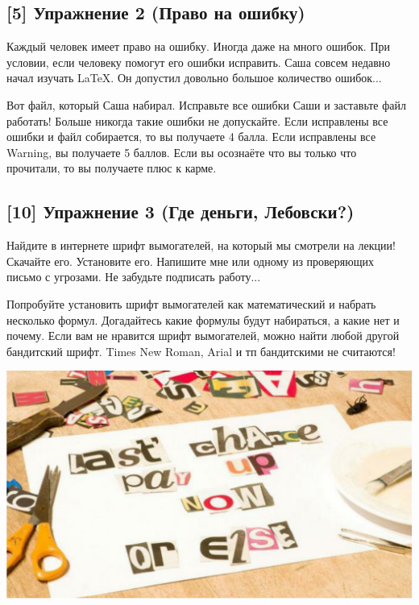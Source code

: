 \documentclass[12pt, a4paper, oneside]{article}
\begin{document}
\subsection*{[5]  Упражнение 2 (Право на ошибку)}


Каждый человек имеет право на ошибку. Иногда даже на много ошибок. При условии, если человеку помогут его ошибки исправить. Саша совсем недавно начал изучать LaTeX. Он допустил довольно большое количество ошибок...

Вот файл, который Саша набирал. Исправьте все ошибки Саши и заставьте файл работать! Больше никогда такие ошибки не допускайте. Если исправлены все ошибки и файл собирается, то вы получаете 4 балла. Если исправлены все Warning, вы получаете 5 баллов. Если вы осознаёте что вы только что прочитали, то вы получаете плюс к карме.


\subsection*{[10]  Упражнение 3 (Где деньги, Лебовски?)}

Найдите в интернете шрифт вымогателей, на который мы смотрели на лекции! Скачайте его. Установите его. Напишите мне или одному из проверяющих письмо с угрозами. Не забудьте подписать работу...

Попробуйте установить шрифт вымогателей как математический и набрать несколько формул. Догадайтесь какие формулы будут набираться, а какие нет и почему. Если вам не нравится шрифт вымогателей, можно найти любой другой бандитский шрифт. Times New Roman, Arial и тп бандитскими не считаются!

\begin{center}
\includegraphics[scale=0.2]{letters.png}
\end{center} 
\end{document}
